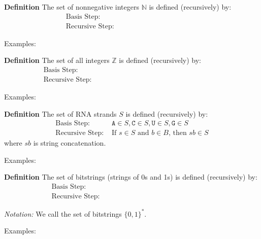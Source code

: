 \documentclass[12pt, oneside]{article}
\newcommand{\A}[0]{\texttt{A}}
\newcommand{\C}[0]{\texttt{C}}
\newcommand{\G}[0]{\texttt{G}}
\newcommand{\U}[0]{\texttt{U}}
\begin{document}
{\bf Definition} The set of nonnegative integers $\mathbb{N}$ is defined (recursively) by: 
\[
\begin{array}{ll}
\textrm{Basis Step: } & \phantom{0 \in \mathbb{N}} \\
\textrm{Recursive Step: } & \phantom{\textrm{If } n \in \mathbb{N} \textrm{, then } n+1 \in \mathbb{N}}
\end{array}
\]

Examples: 

{\bf Definition} The set of all integers $\mathbb{Z}$ is defined (recursively) by: 
\[
\begin{array}{ll}
\textrm{Basis Step: } & \phantom{0 \in \mathbb{Z}} \\
\textrm{Recursive Step: } & \phantom{\textrm{If } x \in \mathbb{Z} \textrm{, then } x+1 \in \mathbb{Z}
\textrm{ and } x-1 \in \mathbb{Z}}
\end{array}
\]

Examples: 

\vfill

{\bf Definition} The set of RNA strands $S$ is defined (recursively) by:
\[
\begin{array}{ll}
\textrm{Basis Step: } & \A \in S, \C \in S, \U \in S, \G \in S \\
\textrm{Recursive Step: } & \textrm{If } s \in S\textrm{ and }b \in B \textrm{, then }sb \in S
\end{array}
\]
where $sb$ is string concatenation.

Examples: 

\vfill

{\bf Definition} The set of bitstrings (strings of 0s and 1s) is defined (recursively) by:
\[
\begin{array}{ll}
\textrm{Basis Step: } & \phantom{\lambda \in X} \\
\textrm{Recursive Step: } & \phantom{\textrm{If } s \in X \textrm{, then } s0 \in X \text{ and } s1 \in X}
\end{array}
\]

{\it Notation:} We call the set of bitstrings $\{0,1\}^*$.

Examples: 

\vfill \newpage
\end{document}
